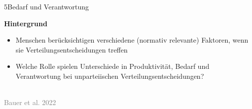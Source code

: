 \documentclass[xcolor=table,9pt,aspectratio=169]{beamer}
\begin{document}
\begin{frame}{\vspace*{10mm}5\hspace*{1em}Bedarf und Verantwortung}
\begin{multicols}{2}
   \textbf{Hintergrund}\\
   \medskip
   \begin{itemize}
      \item Menschen berücksichtigen verschiedene (normativ relevante) Faktoren, wenn sie Verteilungsentscheidungen treffen
      \item Welche Rolle spielen Unterschiede in Produktivität, Bedarf und Verantwortung bei unparteiischen Verteilungsentscheidungen?
   \end{itemize}
   \vfill
   \begin{center}
      \\
      \textcolor{gray}{Bauer et al. 2022}
   \end{center}
\end{multicols}
\end{frame}
\end{document}
